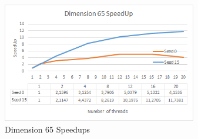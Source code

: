 \documentclass[conference]{IEEEtran}
\begin{document}
\begin{figure}[H]
\centering
\includegraphics[width=85mm]{TestesFinais/Dimension65Speedup}
\caption{Dimension 65 Speedups}
\end{figure}
\end{document}
